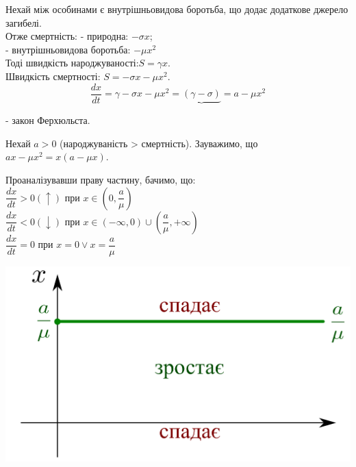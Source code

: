 Нехай між особинами є внутрішньовидова боротьба, що додає додаткове джерело загибелі.\\
Отже смертність: - природна:  $-\sigma x$;\\
\hspace*{4.01cm}- внутрішньовидова боротьба: $- \mu x^2$\\
Тоді швидкість народжуваності:$S = \gamma x$.\\
Швидкість смертності:  $ S = - \sigma x - \mu x^2$.\\
$$
\frac{dx}{dt}  = \gamma -  \sigma x - \mu x^2 = \underbrace{(\gamma - \sigma)}{=a} - \mu x^2
$$

\begin{center}
     - закон Ферхюльста.
\end{center}
Нехай $a > 0$ (народжуваність > смертність).  Зауважимо, що $ax - \mu x^2 = x ( a - \mu x)$.

Проаналізувавши праву частину, бачимо, що:\\
$
\dfrac{dx}{dt} > 0 (\uparrow) \text{ при } x \in (0, \dfrac{a}{\mu} )
$\\
$
\dfrac{dx}{dt} < 0 (\downarrow) \text{ при } x \in (- \infty, 0) \cup ( \dfrac{a}{\mu},  +\infty)
$\\
$
\dfrac{dx}{dt} = 0 \text{ при } x = 0 \lor x = \dfrac{a}{\mu}
$\\

\begin{center} \includegraphics[scale=0.3]{assets/lectures_recent-e4b7cd02.png} \end{center}

